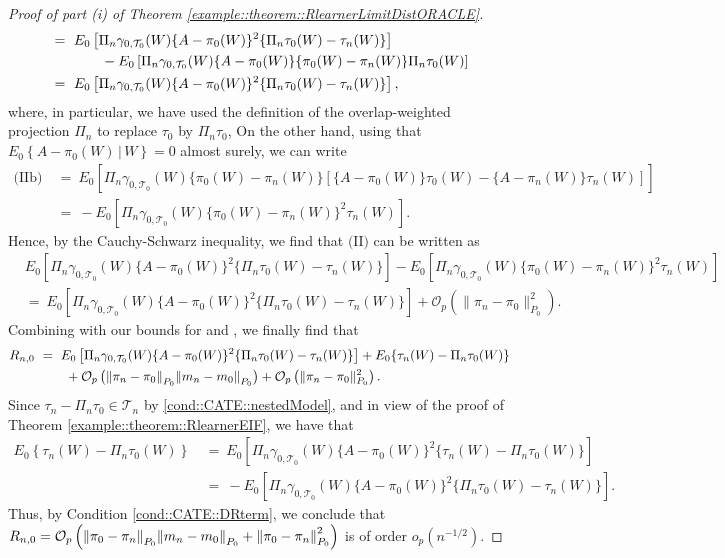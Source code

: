 \documentclass[11pt]{article}
\theoremstyle{definition}
\begin{document}
\begin{proof}[Proof of part (i) of Theorem   \ref{example::theorem::RlearnerLimitDistORACLE}]
\begin{align*}
 &=\ E_0\left[\Pi_n \gamma_{0, \mathcal{T}_0}(W)\{A-\pi_0(W)\}^2 \{\Pi_n\tau_0(W)  - \tau_n(W)\}\right]\\
 &\hspace{.5in}- E_0\left[\Pi_n \gamma_{0, \mathcal{T}_0}(W)\{A-\pi_0(W)\}\{\pi_0(W) - \pi_n(W)\}\Pi_n\tau_0(W)\right]\\
 &=\ E_0\left[\Pi_n \gamma_{0, \mathcal{T}_0}(W)\{A-\pi_0(W)\}^2 \{\Pi_n\tau_0(W)  - \tau_n(W)\}\right]  ,
 \end{align*}where, in particular, we have used the definition of the overlap-weighted projection $\Pi_n$ to replace $\tau_0$ by $\Pi_n \tau_0$,
On the other hand, using that $E_0\left\{A - \pi_0(W)\,|\, W\right\} = 0$ almost surely, we can write
 \begin{align*}
 \text{(IIb)}\ &=\  E_0\left[\Pi_n \gamma_{0, \mathcal{T}_0}(W)\{\pi_0(W)-\pi_n(W)\}[  \{A-\pi_0(W)\}  \tau_0(W) - \{A - \pi_n(W)\}\tau_n(W) ] \right]\\
 &=\ -E_0\left[\Pi_n \gamma_{0, \mathcal{T}_0}(W)\{\pi_0(W)-\pi_n(W)\}^2\tau_n(W) \right].
 \end{align*}
Hence, by the Cauchy-Schwarz inequality, we find that $\text{(II)}$ can be written as
 \begin{align*}
   &E_0\left[\Pi_n \gamma_{0, \mathcal{T}_0}(W)\{A-\pi_0(W)\}^2 \{\Pi_n\tau_0(W)  - \tau_n(W)\}\right]-E_0\left[\Pi_n \gamma_{0, \mathcal{T}_0}(W)\{\pi_0(W)-\pi_n(W)\}^2\tau_n(W) \right]\\
    &=\ E_0\left[\Pi_n \gamma_{0, \mathcal{T}_0}(W)\{A-\pi_0(W)\}^2 \{\Pi_n\tau_0(W)  - \tau_n(W)\}\right]+\mathcal{O}_p\left(\| \pi_n-  \pi_0 \|_{P_0}^2\right).
 \end{align*}
Combining  with our bounds for  and , we finally find that 
\begin{align*}
     R_{n,0}\ &=\ E_0\left[\Pi_n \gamma_{0, \mathcal{T}_0}(W)\{A-\pi_0(W)\}^2 \{\Pi_n\tau_0(W)  - \tau_n(W)\}\right] + E_0\{\tau_n(W) - \Pi_n \tau_0(W)\}\\
     &\qquad +\mathcal{O}_p\left(\norm{\pi_n-\pi_0}_{P_0}\norm{m_n- m_0}_{P_0}\right) + \mathcal{O}_p\left(\| \pi_n-  \pi_0 \|_{P_0}^2 \right).
\end{align*}
Since $\tau_n -\Pi_n \tau_0 \in \mathcal{T}_n$ by \ref{cond::CATE::nestedModel}, and in view of the proof of Theorem \ref{example::theorem::RlearnerEIF}, we have that
\begin{align*}
    E_0\left\{\tau_n(W) - \Pi_n \tau_0(W)\right\}\ &=\ E_0\left[\Pi_n \gamma_{0, \mathcal{T}_0}(W)\{A-\pi_0(W)\}^2\{\tau_n(W) - \Pi_n \tau_0(W) \}\right]\\
    &=\  -E_0\left[\Pi_n \gamma_{0, \mathcal{T}_0}(W)\{A-\pi_0(W)\}^2\{\Pi_n \tau_0(W) - \tau_n(W) \}\right].
\end{align*}
Thus, by Condition \ref{cond::CATE::DRterm}, we conclude that $R_{n,0} = \mathcal{O}_p\left(\norm{\pi_0-\pi_n}_{P_0}\norm{m_n- m_0}_{P_0}+\norm{\pi_0-\pi_n}_{P_0}^2\right)$ is of order $o_p(n^{-1/2})$.\end{proof}
\end{document}
